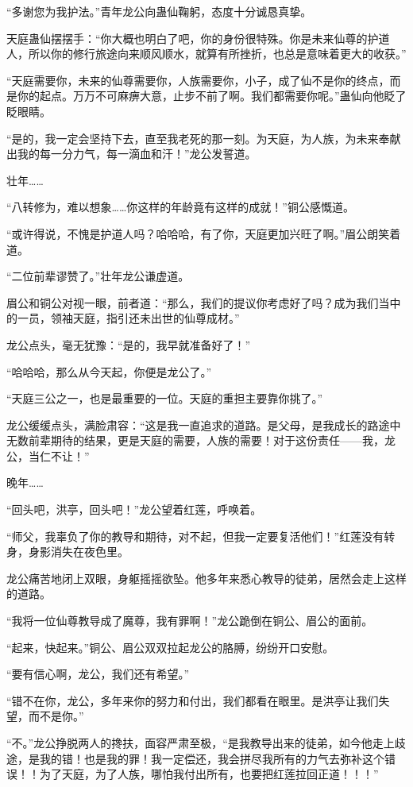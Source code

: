 \begin{this_body}
“多谢您为我护法。”青年龙公向蛊仙鞠躬，态度十分诚恳真挚。

天庭蛊仙摆摆手：“你大概也明白了吧，你的身份很特殊。你是未来仙尊的护道人，所以你的修行旅途向来顺风顺水，就算有所挫折，也总是意味着更大的收获。”

“天庭需要你，未来的仙尊需要你，人族需要你，小子，成了仙不是你的终点，而是你的起点。万万不可麻痹大意，止步不前了啊。我们都需要你呢。”蛊仙向他眨了眨眼睛。

“是的，我一定会坚持下去，直至我老死的那一刻。为天庭，为人族，为未来奉献出我的每一分力气，每一滴血和汗！”龙公发誓道。

壮年……

“八转修为，难以想象……你这样的年龄竟有这样的成就！”铜公感慨道。

“或许得说，不愧是护道人吗？哈哈哈，有了你，天庭更加兴旺了啊。”眉公朗笑着道。

“二位前辈谬赞了。”壮年龙公谦虚道。

眉公和铜公对视一眼，前者道：“那么，我们的提议你考虑好了吗？成为我们当中的一员，领袖天庭，指引还未出世的仙尊成材。”

龙公点头，毫无犹豫：“是的，我早就准备好了！”

“哈哈哈，那么从今天起，你便是龙公了。”

“天庭三公之一，也是最重要的一位。天庭的重担主要靠你挑了。”

龙公缓缓点头，满脸肃容：“这是我一直追求的道路。是父母，是我成长的路途中无数前辈期待的结果，更是天庭的需要，人族的需要！对于这份责任——我，龙公，当仁不让！”

晚年……

“回头吧，洪亭，回头吧！”龙公望着红莲，呼唤着。

“师父，我辜负了你的教导和期待，对不起，但我一定要复活他们！”红莲没有转身，身影消失在夜色里。

龙公痛苦地闭上双眼，身躯摇摇欲坠。他多年来悉心教导的徒弟，居然会走上这样的道路。

“我将一位仙尊教导成了魔尊，我有罪啊！”龙公跪倒在铜公、眉公的面前。

“起来，快起来。”铜公、眉公双双拉起龙公的胳膊，纷纷开口安慰。

“要有信心啊，龙公，我们还有希望。”

“错不在你，龙公，多年来你的努力和付出，我们都看在眼里。是洪亭让我们失望，而不是你。”

“不。”龙公挣脱两人的搀扶，面容严肃至极，“是我教导出来的徒弟，如今他走上歧途，是我的错！也是我的罪！我一定偿还，我会拼尽我所有的力气去弥补这个错误！！为了天庭，为了人族，哪怕我付出所有，也要把红莲拉回正道！！！”


\end{this_body}
